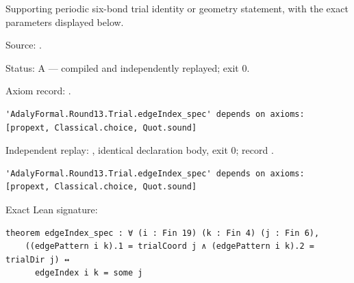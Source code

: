 \begin{theorem}[bp-423]
\label{bp-423}
\leanok
Supporting periodic six-bond trial identity or geometry statement, with the exact parameters displayed below.

\par Source: \texttt{}.
\par Status: A — compiled and independently replayed; exit 0.
\par Axiom record: \texttt{}.
\begin{verbatim}
'AdalyFormal.Round13.Trial.edgeIndex_spec' depends on axioms: [propext, Classical.choice, Quot.sound]
\end{verbatim}
\par Independent replay: \texttt{}, identical declaration body, exit 0; record \texttt{}.
\begin{verbatim}
'AdalyFormal.Round13.Trial.edgeIndex_spec' depends on axioms: [propext, Classical.choice, Quot.sound]
\end{verbatim}
\par Exact Lean signature:
\begin{verbatim}
theorem edgeIndex_spec : ∀ (i : Fin 19) (k : Fin 4) (j : Fin 6),
    ((edgePattern i k).1 = trialCoord j ∧ (edgePattern i k).2 = trialDir j) ↔
      edgeIndex i k = some j
\end{verbatim}
\end{theorem}

